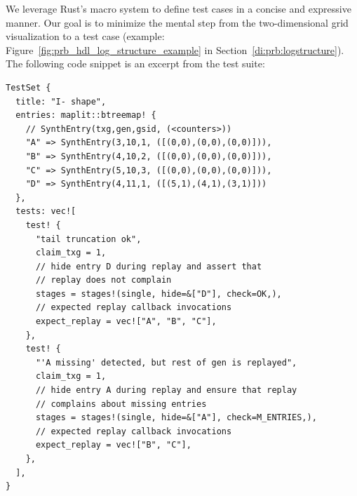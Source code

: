 \documentclass[12pt,a4paper,twoside]{book}
\begin{document}
We leverage Rust's macro system to define test cases in a concise and expressive manner.
Our goal is to minimize the mental step from the two-dimensional grid visualization to a test case (example: Figure~\ref{fig:prb_hdl_log_structure_example} in Section~\ref{di:prb:logstructure}).
The following code snippet is an excerpt from the test suite:

\begin{lstlisting}[style=figurepseudocode]
TestSet {
  title: "I- shape",
  entries: maplit::btreemap! {
    // SynthEntry(txg,gen,gsid, (<counters>))
    "A" => SynthEntry(3,10,1, ([(0,0),(0,0),(0,0)])),
    "B" => SynthEntry(4,10,2, ([(0,0),(0,0),(0,0)])),
    "C" => SynthEntry(5,10,3, ([(0,0),(0,0),(0,0)])),
    "D" => SynthEntry(4,11,1, ([(5,1),(4,1),(3,1)]))
  },
  tests: vec![
    test! {
      "tail truncation ok",
      claim_txg = 1,
      // hide entry D during replay and assert that
      // replay does not complain
      stages = stages!(single, hide=&["D"], check=OK,),
      // expected replay callback invocations
      expect_replay = vec!["A", "B", "C"],
    },
    test! {
      "'A missing' detected, but rest of gen is replayed",
      claim_txg = 1,
      // hide entry A during replay and ensure that replay
      // complains about missing entries
      stages = stages!(single, hide=&["A"], check=M_ENTRIES,),
      // expected replay callback invocations
      expect_replay = vec!["B", "C"],
    },
  ],
}
\end{lstlisting}
\end{document}
